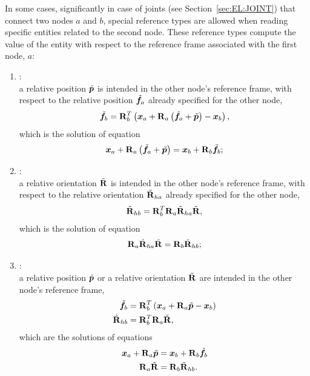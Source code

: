 In some cases, significantly in case of joints (see Section~\ref{sec:EL:JOINT}) that connect two nodes
$a$ and $b$, special reference types are allowed
when reading specific entities related to the second node.
These reference types compute the value of the entity with respect
to the reference frame associated with the first node, $a$:
\begin{enumerate}
\item {}: \\
	a relative position $\tilde{\boldsymbol{p}}$ is intended in the other node's
	reference frame, with respect to the relative position $\tilde{\boldsymbol{f}}_a$
	already specified for the other node,
\begin{equation}
	\tilde{\boldsymbol{f}}_b = \bm{\mathbf R}_b^T\left( 
		\boldsymbol{x}_a + \bm{\mathbf R}_a \left( 
			\tilde{\boldsymbol{f}}_a
			+ \tilde{\boldsymbol{p}}
		 \right)
		- \boldsymbol{x}_b
	 \right) ,
\end{equation}
	which is the solution of equation
\begin{equation}
	\boldsymbol{x}_a + \bm{\mathbf R}_a \left( \tilde{\boldsymbol{f}}_a + \tilde{\boldsymbol{p}} \right)
	= \boldsymbol{x}_b + \bm{\mathbf R}_b \tilde{\boldsymbol{f}}_b ;
\end{equation}

\item {}: \\
	a relative orientation $\tilde{\bm{\mathbf R}} $ is intended in the other node's
	reference frame, with respect to the relative orientation
	$\tilde{\bm{\mathbf R}}_{ha}$ already specified for the other node,
\begin{equation}
	\tilde{\bm{\mathbf R}}_{hb} = \bm{\mathbf R}_b^T \bm{\mathbf R}_a \tilde{\bm{\mathbf R}}_{ha} \tilde{\bm{\mathbf R}} ,
\end{equation}
	which is the solution of equation
\begin{equation}
	\bm{\mathbf R}_a \tilde{\bm{\mathbf R}}_{ha} \tilde{\bm{\mathbf R}}
	= \bm{\mathbf R}_b \tilde{\bm{\mathbf R}}_{hb} ;
\end{equation}

\item {}: \\
	a relative position $\tilde{\boldsymbol{p}}$
	or a relative orientation $\tilde{\bm{\mathbf R}}$
	are intended in the other node's reference frame,
\begin{subequations}
\begin{align}
	\tilde{\boldsymbol{f}}_b &= \bm{\mathbf R}_b^T\left( 
		\boldsymbol{x}_a + \bm{\mathbf R}_a \tilde{\boldsymbol{p}}
		- \boldsymbol{x}_b
	 \right) \\
	\tilde{\bm{\mathbf R}}_{hb} &= \bm{\mathbf R}_b^T \bm{\mathbf R}_a \tilde{\bm{\mathbf R}} ,
\end{align}
\end{subequations}
	which are the solutions of equations
\begin{subequations}
\begin{align}
	\boldsymbol{x}_a + \bm{\mathbf R}_a \tilde{\boldsymbol{p}}
	&= \boldsymbol{x}_b + \bm{\mathbf R}_b \tilde{\boldsymbol{f}}_b \\
	\bm{\mathbf R}_a \tilde{\bm{\mathbf R}}
	&= \bm{\mathbf R}_b \tilde{\bm{\mathbf R}}_{hb} .
\end{align}
\end{subequations}
\end{enumerate}

